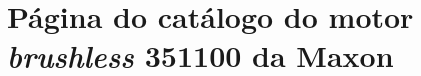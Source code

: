 \documentclass[
	12pt,				%
	openany,			%
	twoside,			%
	a4paper,			%
	english,			%
	french,				%
	spanish,			%
	brazil,				%
	oldfontcommands
	]{abntex2}
\begin{document}
\begin{anexosenv}
\partanexos
\chapter{Página do catálogo do motor \textit{brushless} 351100 da Maxon}



\label{an:MM}



%
%
%
%
%
%

\chapter{}

\label{an:}

\end{anexosenv}
\end{document}

